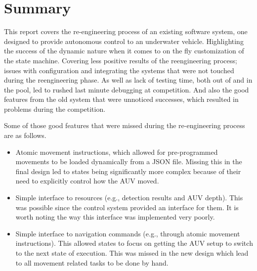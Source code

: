 \documentclass[
11pt, %
oneside, %
english, %
singlespacing, %
parskip, %
headsepline, %
chapterinoneline, %
]{MastersDoctoralThesis} %
\begin{document}

\tableofcontents %

\listoffigures %

\listoftables %

%


\newpage
\section*{Summary}

This report covers the re-engineering process of an existing software system,
one designed to provide autonomous control to an underwater vehicle.
Highlighting the success of the dynamic nature when it comes to on the fly
customization of the state machine.
Covering less positive results of the reengineering process; issues with
configuration and integrating the systems that were not
touched during the reengineering phase.
As well as lack of testing time, both out of and in the pool, led to rushed
last minute debugging at competition.
And also the good features from the old system that were unnoticed successes,
which resulted in problems during the competition.

Some of those good features that were missed during the re-engineering process
are as follows.

\begin{itemize}
\item Atomic movement instructions, which allowed for pre-programmed movements
  to be loaded dynamically from a \gls{JSON} file. Missing this in the final
  design led to states being significantly more complex because of their need to
  explicitly control how the AUV moved.
\item Simple interface to resources (e.g., detection results and AUV depth).
  This was possible since the control system provided an interface for them. It
  is worth noting the way this interface was implemented very poorly.
\item Simple interface to navigation commands (e.g., through atomic movement
  instructions). This allowed states to focus on getting the AUV setup to switch
  to the next state of execution. This was missed in the new design which lead
  to all movement related tasks to be done by hand.
\end{itemize}
\end{document}
